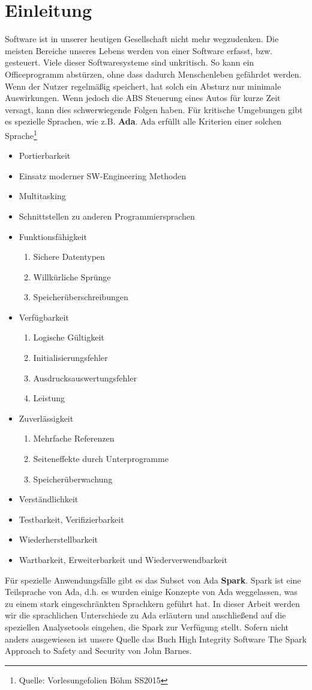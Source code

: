 \section{Einleitung}
Software ist in unserer heutigen Gesellschaft nicht mehr wegzudenken. Die meisten Bereiche unseres Lebens werden von einer Software erfasst, bzw. gesteuert. Viele dieser Softwaresysteme sind unkritisch. So kann ein Officeprogramm abstürzen, ohne dass dadurch Menschenleben gefährdet werden. Wenn der Nutzer regelmäßig speichert, hat solch ein Absturz nur minimale Auswirkungen. Wenn jedoch die ABS Steuerung eines Autos für kurze Zeit versagt, kann dies schwerwiegende Folgen haben.
Für kritische Umgebungen gibt es spezielle Sprachen, wie z.B. \textbf{Ada}.
Ada erfüllt alle Kriterien einer solchen Sprache\footnote{Quelle: Vorlesungefolien Böhm SS2015}
\begin{itemize}
\setlength\itemsep{0.5em}
\item Portierbarkeit
\item Einsatz moderner SW-Engineering Methoden
\item Multitasking
\item Schnittstellen zu anderen Programmiersprachen
\item Funktionsfähigkeit \begin{enumerate}
\item Sichere Datentypen
\item Willkürliche Sprünge
\item Speicherüberschreibungen
\end{enumerate}
\item Verfügbarkeit
\begin{enumerate}
\item Logische Gültigkeit
\item Initialisierungsfehler
\item Ausdrucksauswertungsfehler
\item Leistung
\end{enumerate}
\item Zuverlässigkeit
\begin{enumerate}
\item Mehrfache Referenzen
\item Seiteneffekte durch Unterprogramme
\item Speicherüberwachung
\end{enumerate}
\item Verständlichkeit
\item Testbarkeit, Verifizierbarkeit
\item Wiederherstellbarkeit
\item Wartbarkeit, Erweiterbarkeit und Wiederverwendbarkeit
\end{itemize}

Für spezielle Anwendungsfälle gibt es das Subset von Ada \textbf{Spark}. Spark ist eine Teilsprache von Ada, d.h. es wurden einige Konzepte von Ada weggelassen, was zu einem stark eingeschränkten Sprachkern geführt hat.
In dieser Arbeit werden wir die sprachlichen Unterschiede zu Ada erläutern und anschließend auf die speziellen Analysetools eingehen, die Spark zur Verfügung stellt. Sofern nicht anders ausgewiesen ist unsere Quelle das Buch High Integrity Software The Spark Approach to Safety and Security von John Barnes.
